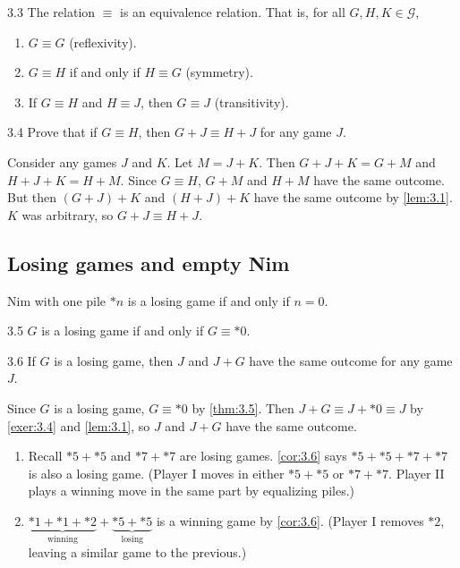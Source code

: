 \documentclass[12pt,letterpaper]{report}
\begin{document}
\begin{lem}{}{3.3}
  The relation $\equiv$ is an equivalence relation.
  That is, for all $G, H, K \in \mathcal{G}$,
  \begin{enumerate}
    \item $G \equiv G$ (reflexivity).
    \item $G \equiv H$ if and only if $H \equiv G$ (symmetry).
    \item If $G \equiv H$ and $H \equiv J$, then $G \equiv J$ (transitivity).
  \end{enumerate}
\end{lem}

\begin{exer}{}{3.4}
  Prove that if $G \equiv H$, then $G + J \equiv H + J$ for any game $J$.
\end{exer}

\begin{exerproof}
  Consider any games $J$ and $K$.
  Let $M = J + K$.
  Then $G + J + K = G + M$ and $H + J + K = H + M$.
  Since $G \equiv H$, $G + M$ and $H + M$ have the same outcome.
  But then $(G + J) + K$ and $(H + J) + K$ have the same outcome by \cref{lem:3.1}.
  $K$ was arbitrary, so $G + J \equiv H + J$.
\end{exerproof}

\pagebreak
\subsection{Losing games and empty Nim}

Nim with one pile $*n$ is a losing game if and only if $n = 0$.

\begin{thm}{}{3.5}
  $G$ is a losing game if and only if $G \equiv *0$.
\end{thm}

\begin{cor}{}{3.6}
  If $G$ is a losing game, then $J$ and $J + G$ have the same outcome for any game $J$.
\end{cor}

\begin{thmproof}
  Since $G$ is a losing game, $G \equiv *0$ by \cref{thm:3.5}.
  Then $J + G \equiv J + *0 \equiv J$ by \cref{exer:3.4} and \cref{lem:3.1}, so $J$ and $J + G$ have
  the same outcome.
\end{thmproof}

\begin{ex}
  \begin{enumerate}
    \item
      Recall $*5 + *5$ and $*7 + *7$ are losing games.
      \cref{cor:3.6} says $*5 + *5 + *7 + *7$ is also a losing game.
      (Player I moves in either $*5 + *5$ or $*7 + *7$.
      Player II plays a winning move in the same part by equalizing piles.)
    \item
      $\underbrace{*1 + *1 + *2}_{\text{winning}} + \underbrace{*5 + *5}_{\text{losing}}$ is a
      winning game by \cref{cor:3.6}.
      (Player I removes $*2$, leaving a similar game to the previous.)
  \end{enumerate}
\end{ex}
\end{document}
